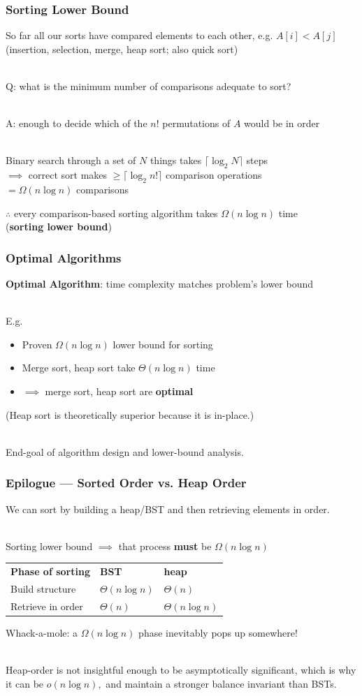 \documentclass{beamer}
\newcommand{\stanza}{ \\~\ }
\begin{document}
\begin{frame} \frametitle{Sorting Lower Bound}
So far all our sorts have compared elements to each other, e.g. $A[i] < A[j]$ \\
(insertion, selection, merge, heap sort; also quick sort) \stanza

Q: what is the minimum number of comparisons adequate to sort? \stanza

A: enough to decide which of the $n!$ permutations of $A$ would be in order \stanza

Binary search through a set of $N$ things takes $\lceil \log_2 N \rceil$ steps \\
$\implies $ correct sort makes $\geq \lceil \log_2 n! \rceil$ comparison operations \\
$= \Omega(n \log n)$ comparisons

$\therefore$ every comparison-based sorting algorithm takes $\Omega(n \log n)$ time \\
(\textbf{sorting lower bound})
\end{frame}

\begin{frame} \frametitle{Optimal Algorithms}
\textbf{Optimal Algorithm}: time complexity matches problem's lower bound \stanza

E.g.
\begin{itemize}
  \item Proven $\Omega(n \log n)$ lower bound for sorting
  \item Merge sort, heap sort take $\Theta(n \log n)$ time
  \item $\implies$ merge sort, heap sort are \textbf{optimal}
\end{itemize}

(Heap sort is theoretically superior because it is in-place.) \stanza

End-goal of algorithm design and lower-bound analysis.
\end{frame}

\begin{frame} \frametitle{Epilogue --- Sorted Order vs. Heap Order}
We can sort by building a heap/BST and then retrieving elements in order. \stanza

Sorting lower bound $\implies$ that process \textbf{must} be $\Omega(n \log n)$

\begin{center}
\begin{tabular}{lll}
\textbf{Phase of sorting} & \textbf{BST} & \textbf{heap} \\
Build structure & $\Theta(n \log n)$ & $\Theta(n)$ \\
Retrieve in order & $\Theta(n)$ & $\Theta(n \log n)$ \\
\end{tabular}
\end{center}
Whack-a-mole: a $\Omega(n \log n)$ phase inevitably pops up somewhere! \stanza

Heap-order is not insightful enough to be asymptotically significant, which is
 why it can be $o(n \log n),$ and maintain a stronger balance invariant than
 BSTs.

\end{frame}
\end{document}

